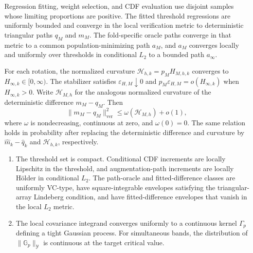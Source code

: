 \begin{highlevelassumption}
\label{ass:candidates}
Regression fitting, weight selection, and CDF evaluation use disjoint samples
whose limiting proportions are positive. The fitted threshold regressions are
uniformly bounded and converge in the local verification metric to
deterministic triangular paths \(q_M\) and \(m_M\). The fold-specific oracle
paths converge in that metric to a common population-minimizing path \(a_M\),
and \(a_M\) converges locally and uniformly over thresholds in conditional
\(L_2\) to a bounded path \(a_\infty\).
\end{highlevelassumption}

\begin{highlevelassumption}
\label{ass:transfer-path}
For each rotation, the normalized curvature
\(\mathcal H_{h,k}=p_MH_{M,h,k}\) converges to
\(H_{\infty,k}\in[0,\infty)\). The stabilizer satisfies
\(\varepsilon_{H,M}\downarrow0\) and
\(p_M\varepsilon_{H,M}=o(H_{\infty,k})\) when \(H_{\infty,k}>0\).
Write \(\mathcal H_{M,h}\) for the analogous normalized curvature of the
deterministic difference \(m_M-q_M\). Then
\[
\|m_M-q_M\|_{\mathrm{ver}}^2
\le \omega(\mathcal H_{M,h})+o(1),
\]
where \(\omega\) is nondecreasing, continuous at zero, and \(\omega(0)=0\).
The same relation holds in probability after replacing the deterministic
difference and curvature by \(\widehat m_k-\widehat q_k\) and
\(\mathcal H_{h,k}\), respectively.
\end{highlevelassumption}

\begin{highlevelassumption}
\label{ass:process}
\begin{enumerate}[label=(\alph*),leftmargin=2em]
\item The threshold set is compact. Conditional CDF increments are locally
Lipschitz in the threshold, and augmentation-path increments are locally
H\"older in conditional \(L_2\). The path-oracle and fitted-difference classes
are uniformly VC-type, have square-integrable envelopes satisfying the
triangular-array Lindeberg condition, and have fitted-difference envelopes that
vanish in the local \(L_2\) metric.
\item The local covariance integrand converges uniformly to a continuous
kernel \(\Gamma_p\) defining a tight Gaussian process. For simultaneous bands,
the distribution of \(\|\mathbb G_p\|_{\mathcal Y}\) is continuous at the
target critical value.
\end{enumerate}
\end{highlevelassumption}

